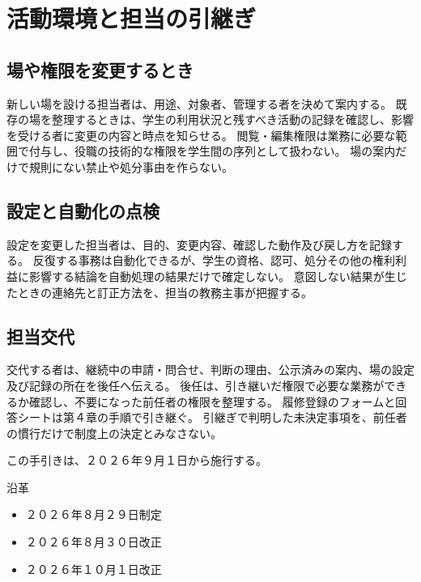 ﻿\newpage
\chapter{活動環境と担当の引継ぎ}

\section{場や権限を変更するとき}

新しい場を設ける担当者は、用途、対象者、管理する者を決めて案内する。
既存の場を整理するときは、学生の利用状況と残すべき活動の記録を確認し、影響を受ける者に変更の内容と時点を知らせる。
閲覧・編集権限は業務に必要な範囲で付与し、役職の技術的な権限を学生間の序列として扱わない。
場の案内だけで規則にない禁止や処分事由を作らない。

\section{設定と自動化の点検}

設定を変更した担当者は、目的、変更内容、確認した動作及び戻し方を記録する。
反復する事務は自動化できるが、学生の資格、認可、処分その他の権利利益に影響する結論を自動処理の結果だけで確定しない。
意図しない結果が生じたときの連絡先と訂正方法を、担当の教務主事が把握する。

\section{担当交代}

交代する者は、継続中の申請・問合せ、判断の理由、公示済みの案内、場の設定及び記録の所在を後任へ伝える。
後任は、引き継いだ権限で必要な業務ができるか確認し、不要になった前任者の権限を整理する。
履修登録のフォームと回答シートは第４章の手順で引き継ぐ。
引継ぎで判明した未決定事項を、前任者の慣行だけで制度上の決定とみなさない。

\bigskip
\noindent

この手引きは、２０２６年９月１日から施行する。

\bigskip
\noindent 沿革
\begin{itemize}
\item ２０２６年８月２９日制定
\item ２０２６年８月３０日改正
\item ２０２６年１０月１日改正
\end{itemize}
